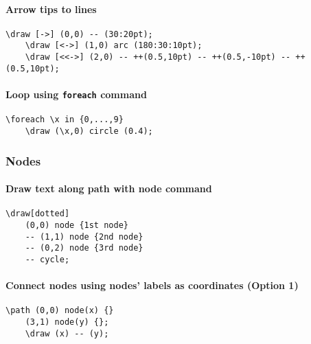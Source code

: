 \documentclass{article}
\begin{document}


\paragraph{Arrow tips to lines}
\begin{Verbatim}[fontsize=\scriptsize]
    \draw [->] (0,0) -- (30:20pt);
    \draw [<->] (1,0) arc (180:30:10pt);
    \draw [<<->] (2,0) -- ++(0.5,10pt) -- ++(0.5,-10pt) -- ++(0.5,10pt);
\end{Verbatim}

\paragraph{Loop using \texttt{foreach} command}
\begin{Verbatim}[fontsize=\scriptsize]
    \foreach \x in {0,...,9}
    \draw (\x,0) circle (0.4);
\end{Verbatim}

\subsubsection{Nodes}
\paragraph{Draw text along path with node command}
\begin{Verbatim}[fontsize=\scriptsize]
    \draw[dotted]
    (0,0) node {1st node}
    -- (1,1) node {2nd node}
    -- (0,2) node {3rd node}
    -- cycle;
\end{Verbatim}

\paragraph{Connect nodes using nodes' labels as coordinates (Option 1)}
\begin{Verbatim}[fontsize=\scriptsize]
    \path (0,0) node(x) {}
    (3,1) node(y) {};
    \draw (x) -- (y);
\end{Verbatim}
\end{document}
